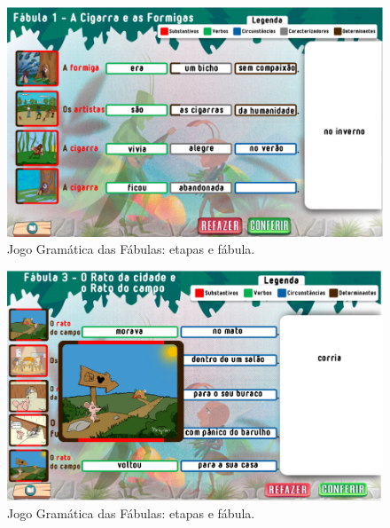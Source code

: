 \begin{figure}[h]
\centering
\begin{minipage}{.7\textwidth}
\includegraphics[width=\textwidth]{figure01.png}
\caption{Jogo Gramática das Fábulas: etapas e fábula.}
\label{fig:fig01}
\end{minipage}
\end{figure}

\begin{figure}[h] 
\centering
\begin{minipage}{.7\textwidth}
\includegraphics[width=\textwidth]{figure02.png}
\caption{Jogo Gramática das Fábulas: etapas e fábula.}
\label{fig:fig02}
\end{minipage}
\end{figure}

